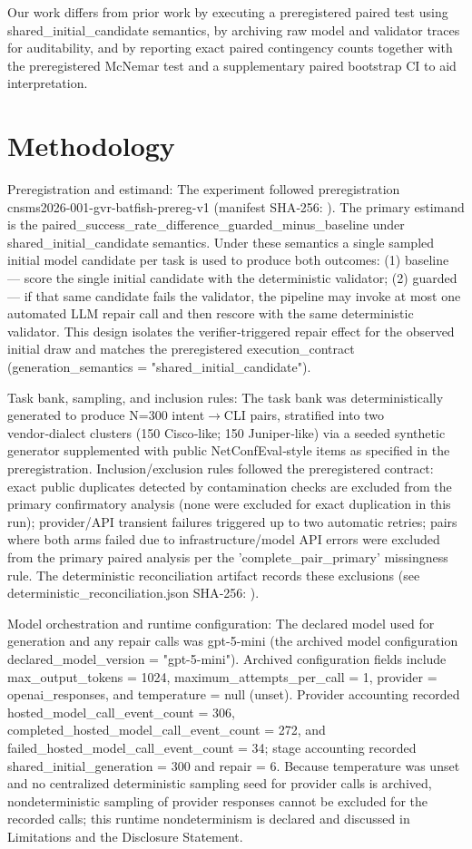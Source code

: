 \documentclass[conference]{IEEEtran}
\begin{document}
Our work differs from prior work by executing a preregistered paired test using shared\_initial\_candidate semantics, by archiving raw model and validator traces for auditability, and by reporting exact paired contingency counts together with the preregistered McNemar test and a supplementary paired bootstrap CI to aid interpretation.

\section{Methodology}
Preregistration and estimand: The experiment followed preregistration cnsms2026-001-gvr-batfish-prereg-v1 (manifest SHA‑256: ). The primary estimand is the paired\_success\_rate\_difference\_guarded\_minus\_baseline under shared\_initial\_candidate semantics. Under these semantics a single sampled initial model candidate per task is used to produce both outcomes: (1) baseline --- score the single initial candidate with the deterministic validator; (2) guarded --- if that same candidate fails the validator, the pipeline may invoke at most one automated LLM repair call and then rescore with the same deterministic validator. This design isolates the verifier‑triggered repair effect for the observed initial draw and matches the preregistered execution\_contract (generation\_semantics = "shared\_initial\_candidate").

Task bank, sampling, and inclusion rules: The task bank was deterministically generated to produce N=300 intent\ensuremath{\rightarrow}CLI pairs, stratified into two vendor‑dialect clusters (150 Cisco‑like; 150 Juniper‑like) via a seeded synthetic generator supplemented with public NetConfEval‑style items as specified in the preregistration. Inclusion/exclusion rules followed the preregistered contract: exact public duplicates detected by contamination checks are excluded from the primary confirmatory analysis (none were excluded for exact duplication in this run); provider/API transient failures triggered up to two automatic retries; pairs where both arms failed due to infrastructure/model API errors were excluded from the primary paired analysis per the 'complete\_pair\_primary' missingness rule. The deterministic reconciliation artifact records these exclusions (see deterministic\_reconciliation.json SHA‑256: ).

Model orchestration and runtime configuration: The declared model used for generation and any repair calls was gpt-5-mini (the archived model configuration declared\_model\_version = "gpt-5-mini"). Archived configuration fields include max\_output\_tokens = 1024, maximum\_attempts\_per\_call = 1, provider = openai\_responses, and temperature = null (unset). Provider accounting recorded hosted\_model\_call\_event\_count = 306, completed\_hosted\_model\_call\_event\_count = 272, and failed\_hosted\_model\_call\_event\_count = 34; stage accounting recorded shared\_initial\_generation = 300 and repair = 6. Because temperature was unset and no centralized deterministic sampling seed for provider calls is archived, nondeterministic sampling of provider responses cannot be excluded for the recorded calls; this runtime nondeterminism is declared and discussed in Limitations and the Disclosure Statement.
\end{document}
